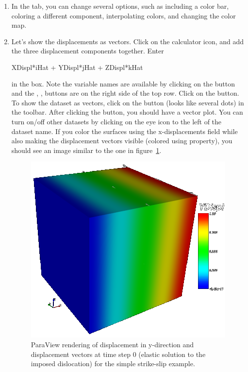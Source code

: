 \begin{enumerate}
\item In the  tab, you can change several options,
  such as including a color bar, coloring a different component,
  interpolating colors, and changing the color map.
\item Let's show the displacements as vectors. Click on the calculator
  icon, and add the three displacement components together. Enter
  \begin{screen}
  XDispl*iHat + YDispl*jHat + ZDispl*kHat
  \end{screen}
  in the  box. Note the variable names are
  available by clicking on the  button and the
  , ,  buttons are on
  the right side of the top row. Click on the 
  button. To show the dataset as vectors, click on the
   button (looks like several dots) in the toolbar.
  After clicking the  button, you should have a
  vector plot. You can turn on/off other datasets by clicking on the
  eye icon to the left of the dataset name. If you color the surfaces
  using the x-displacements field while also making the displacement
  vectors visible (colored using property), you should see an image
  similar to the one in figure~\ref{fig:splitcube:ydisp:vec:t0}.

  \begin{figure}[htbp]
    \begin{center}
      \includegraphics{figs/ydisp_vec_t0}
      \caption{ParaView rendering of displacement in y-direction and
        displacement vectors at time step 0 (elastic solution to the
        imposed dislocation) for the simple strike-slip example.}
      \label{fig:splitcube:ydisp:vec:t0}
    \end{center}
  \end{figure}      

\end{enumerate}

